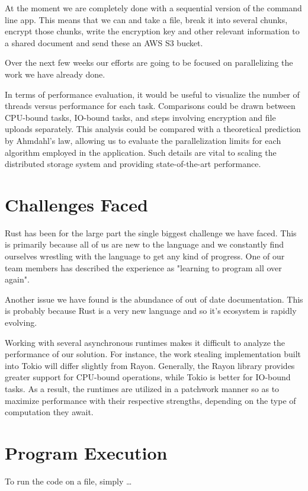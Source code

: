 \documentclass[conference]{IEEEtran}
\begin{document}
At the moment we are completely done with a sequential version of the command line app.
This means that we can and take a file, break it into several chunks, encrypt those chunks,
write the encryption key and other relevant information to a shared document and send these
an AWS S3 bucket.

Over the next few weeks our efforts are going to be focused on parallelizing the work we have
already done.

In terms of performance evaluation, it would be useful to visualize the number of threads 
versus performance for each task. Comparisons could be drawn between CPU-bound tasks, IO-bound tasks,
and steps involving encryption and file uploads separately. This analysis could be compared with a 
theoretical prediction by Ahmdahl's law, allowing us to evaluate the parallelization limits for each
algorithm employed in the application. Such details are vital to scaling the distributed storage 
system and providing state-of-the-art performance.

\section{Challenges Faced}

Rust has been for the large part the single biggest challenge we have faced.
This is primarily because all of us are new to the language and we constantly find ourselves
wrestling with the language to get any kind of progress.
One of our team members has described the experience as "learning to program all over again".

Another issue we have found is the abundance of out of date documentation.
This is probably because Rust is a very new language and so it's ecosystem is rapidly evolving.

Working with several asynchronous runtimes makes it difficult to analyze the performance of our solution. For instance,
the work stealing implementation built into Tokio will differ slightly from Rayon. Generally, the Rayon library provides
greater support for CPU-bound operations, while Tokio is better for IO-bound tasks. As a result, the runtimes are utilized in a patchwork manner so as to maximize performance with their
respective strengths, depending on the type of computation they await. 

\section{Program Execution}
To run the code on a file, simply \dots
\end{document}
